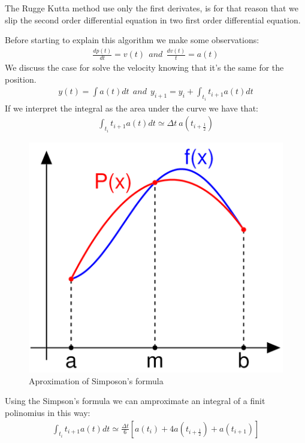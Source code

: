 \documentclass[a4paper]{article}
\begin{document}
The Rugge Kutta method use only the first derivates, is for that reason that we slip the second order differential equation in two first order differential equation. 

Before starting to explain this algorithm we make some observations: 
\begin{align}
\frac{dp(t)}{dt} = v(t) \ \ and \ \ \frac{dv(t)}{t} = a(t) 
\end{align}
We discuss the case for solve the velocity knowing that it's the same for the position.
\begin{align}
y(t) = \int a(t)dt \ \ and \  \ y_{i+1} = y_i + \int_{t_i}{t_{i+1}} a(t)dt
\end{align}
If we interpret the integral as the area under the curve we have that:
\begin{align}
\int_{t_i}{t_{i+1}} a(t)dt \simeq \Delta t \  a(t_{i+\frac{1}{2}})
\end{align}
\begin{figure}
\centering
\includegraphics[scale=0.3]{sim_int.png}
\caption{Aproximation of Simposon's formula}
\end{figure}

Using the Simpson's formula we can amproximate an integral of a finit polinomius in this way: 
\begin{align}
\int_{t_i}{t_{i+1}} a(t)dt \simeq \frac{\Delta t}{6} \left [ a(t_i)+4a(t_{i+\frac{1}{2}})+ a(t_{i+1}) \right ] 
\end{align}
\end{document}
